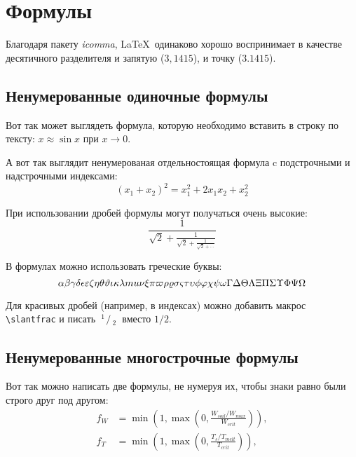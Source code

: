\section{Формулы} \label{sect1_3}

Благодаря пакету \textit{icomma}, \LaTeX~одинаково хорошо воспринимает в качестве десятичного разделителя и запятую ($3,1415$), и точку ($3.1415$).

\subsection{Ненумерованные одиночные формулы} \label{subsect1_3_1}

Вот так может выглядеть формула, которую необходимо вставить в строку по тексту: $x \approx \sin x$ при $x \to 0$.

А вот так выглядит ненумерованая отдельностоящая формула c подстрочными и надстрочными индексами:
\[
(x_1+x_2)^2 = x_1^2 + 2 x_1 x_2 + x_2^2
\]

При использовании дробей формулы могут получаться очень высокие:
\[
  \frac{1}{\sqrt{2}+
  \displaystyle\frac{1}{\sqrt{2}+
  \displaystyle\frac{1}{\sqrt{2}+\cdots}}}
\]

В формулах можно использовать греческие буквы:
\[
\alpha\beta\gamma\delta\epsilon\varepsilon\zeta\eta\theta\vartheta\iota\kappa\lambda\\mu\nu\xi\pi\varpi\rho\varrho\sigma\varsigma\tau\upsilon\phi\varphi\chi\psi\omega\Gamma\Delta\Theta\Lambda\Xi\Pi\Sigma\Upsilon\Phi\Psi\Omega
\]

\def\slantfrac#1#2{ \hspace{3pt}\!^{#1}\!\!\hspace{1pt}/
  \hspace{2pt}\!\!_{#2}\!\hspace{3pt}
} %
Для красивых дробей (например, в индексах) можно добавить макрос
\verb+\slantfrac+ и писать $\slantfrac{1}{2}$ вместо $1/2$.

\subsection{Ненумерованные многострочные формулы} \label{subsect1_3_2}

Вот так можно написать две формулы, не нумеруя их, чтобы знаки равно были строго друг под другом:
\begin{align}
  f_W & =  \min \left( 1, \max \left( 0, \frac{W_{soil} / W_{max}}{W_{crit}} \right)  \right), \nonumber \\
  f_T & =  \min \left( 1, \max \left( 0, \frac{T_s / T_{melt}}{T_{crit}} \right)  \right), \nonumber
\end{align}

